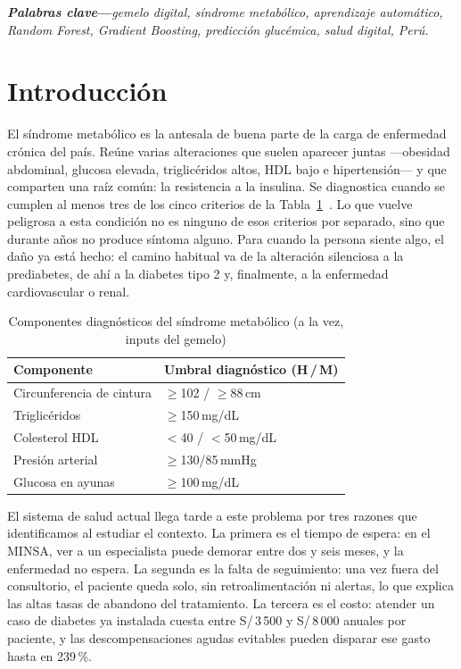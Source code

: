 \documentclass[9pt,letterpaper,twocolumn]{extarticle}
\begin{document}
\vspace{4pt}
\noindent\textbf{\textit{Palabras clave}---}\textit{gemelo digital, síndrome
metabólico, aprendizaje automático, Random Forest, Gradient Boosting, predicción
glucémica, salud digital, Perú.}

\section{Introducción}
El síndrome metabólico es la antesala de buena parte de la carga de enfermedad
crónica del país. Reúne varias alteraciones que suelen aparecer juntas
---obesidad abdominal, glucosa elevada, triglicéridos altos, HDL bajo e
hipertensión--- y que comparten una raíz común: la resistencia a la insulina. Se
diagnostica cuando se cumplen al menos tres de los cinco criterios de la
Tabla~\ref{tab:criterios}~\cite{ncep}. Lo que vuelve peligrosa a esta condición
no es ninguno de esos criterios por separado, sino que durante años no produce
síntoma alguno. Para cuando la persona siente algo, el daño ya está hecho: el
camino habitual va de la alteración silenciosa a la prediabetes, de ahí a la
diabetes tipo 2 y, finalmente, a la enfermedad cardiovascular o renal.

\begin{table}[t]
\caption{Componentes diagnósticos del síndrome metabólico (a la vez, inputs del gemelo)}
\label{tab:criterios}
\footnotesize
\renewcommand{\arraystretch}{1.25}
\begin{tabularx}{\columnwidth}{@{}>{\raggedright\arraybackslash}X
                                >{\raggedleft\arraybackslash}p{3.7cm}@{}}
\toprule
\textbf{Componente} & \textbf{Umbral diagnóstico (H\,/\,M)}\\
\midrule
Circunferencia de cintura & $\geq$102 / $\geq$88\,cm \\
Triglicéridos             & $\geq$150\,mg/dL \\
Colesterol HDL            & $<$40 / $<$50\,mg/dL \\
Presión arterial          & $\geq$130/85\,mmHg \\
Glucosa en ayunas         & $\geq$100\,mg/dL \\
\bottomrule
\end{tabularx}
\end{table}

El sistema de salud actual llega tarde a este problema por tres razones que
identificamos al estudiar el contexto. La primera es el tiempo de espera: en el
MINSA, ver a un especialista puede demorar entre dos y seis meses, y la
enfermedad no espera. La segunda es la falta de seguimiento: una vez fuera del
consultorio, el paciente queda solo, sin retroalimentación ni alertas, lo que
explica las altas tasas de abandono del tratamiento. La tercera es el costo:
atender un caso de diabetes ya instalada cuesta entre S/\,3\,500 y S/\,8\,000
anuales por paciente, y las descompensaciones agudas evitables pueden disparar
ese gasto hasta en 239\,\%.
\end{document}
